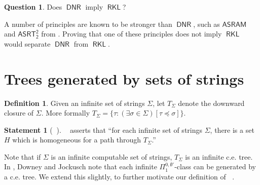 \documentclass{amsart}
\theoremstyle{plain}
\theoremstyle{remark}
\theoremstyle{definition}
\newtheorem{question}[theorem]{Question}
\newtheorem{defn}[theorem]{Definition}
\newtheorem{statement}[theorem]{Statement}
\DeclareMathOperator{\RCA}{\mathsf{RCA}_0}
\DeclareMathOperator{\DNR}{\mathsf{DNR}}
\DeclareMathOperator{\RKL}{\mathsf{RKL}}
\DeclareMathOperator{\RKLp}{\mathsf{RKL}^{(1)}}
\begin{document}
\begin{question}
Does $\DNR$ imply $\RKL$?
\end{question}

A number of principles are known to be stronger than $\DNR$, such as $\mathsf{ASRAM}$ and $\mathsf{ASRT^2_2}$ from \cite{ramseymeasure}.  Proving that one of these principles does not imply $\RKL$ would separate $\DNR$ from $\RKL$.


\section{Trees generated by sets of strings}

\begin{defn}
Given an infinite set of strings $\Sigma$, let $T_{\Sigma}$ denote the downward closure of $\Sigma$.  More formally $T_{\Sigma}=\{\tau : (\exists \sigma\in\Sigma)[\tau\preceq\sigma]\}$.
\end{defn}

\begin{statement}[$\RCA$]
$\RKLp$ asserts that 
	``for each infinite set of strings $\Sigma$, 
	there is a set $H$ which is homogeneous for a path through $T_{\Sigma}$.''
\end{statement}

Note that if $\Sigma$ is an infinite computable set of strings, $T_{\Sigma}$ is an infinite c.e. tree.  
In \cite{boolalg-and-cetree}, Downey and Jockusch note that each infinite $\Pi^{0,\emptyset'}_1$-class can be generated by a c.e. tree.  We extend this slightly, to further motivate our definition of $\RKLp$.
\end{document}

